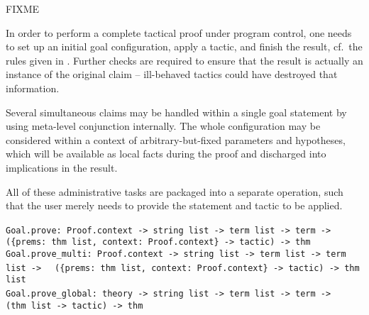\begin{isabellebody}
\begin{isamarkuptext}
%
\end{isamarkuptext}%
\isamarkuptrue%
%
\isamarkuptrue%
%
\begin{isamarkuptext}%
FIXME

%
\end{isamarkuptext}%
\isamarkuptrue%
%
\isamarkuptrue%
%
\begin{isamarkuptext}%
In order to perform a complete tactical proof under program control,
  one needs to set up an initial goal configuration, apply a tactic,
  and finish the result, cf.\ the rules given in
  .  Further checks are required to ensure
  that the result is actually an instance of the original claim --
  ill-behaved tactics could have destroyed that information.

  Several simultaneous claims may be handled within a single goal
  statement by using meta-level conjunction internally.  The whole
  configuration may be considered within a context of
  arbitrary-but-fixed parameters and hypotheses, which will be
  available as local facts during the proof and discharged into
  implications in the result.

  All of these administrative tasks are packaged into a separate
  operation, such that the user merely needs to provide the statement
  and tactic to be applied.%
\end{isamarkuptext}%
\isamarkuptrue%
%
\isadelimmlref
%
\endisadelimmlref
%
\isatagmlref
%
\begin{isamarkuptext}%
\begin{mldecls}
  \verb|Goal.prove: Proof.context -> string list -> term list -> term ->|\isasep\isanewline%
\verb|  ({prems: thm list, context: Proof.context} -> tactic) -> thm| \\
  \verb|Goal.prove_multi: Proof.context -> string list -> term list -> term list ->|\isasep\isanewline%
\verb|  ({prems: thm list, context: Proof.context} -> tactic) -> thm list| \\
  \verb|Goal.prove_global: theory -> string list -> term list -> term ->|\isasep\isanewline%
\verb|  (thm list -> tactic) -> thm| \\
  \end{mldecls}


\end{isamarkuptext}
\end{isabellebody}
